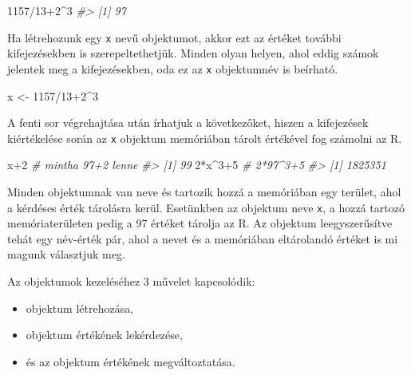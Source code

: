 \documentclass[
]{book}
\newenvironment{Shaded}{\begin{snugshade}}{\end{snugshade}}
\newcommand{\CommentTok}[1]{\textcolor[rgb]{0.56,0.35,0.01}{\textit{#1}}}
\newcommand{\DecValTok}[1]{\textcolor[rgb]{0.00,0.00,0.81}{#1}}
\newcommand{\NormalTok}[1]{#1}
\newcommand{\OtherTok}[1]{\textcolor[rgb]{0.56,0.35,0.01}{#1}}
\newcommand{\SpecialCharTok}[1]{\textcolor[rgb]{0.00,0.00,0.00}{#1}}
\providecommand{\tightlist}{%
  \setlength{\itemsep}{0pt}\setlength{\parskip}{0pt}}
\begin{document}
\begin{Shaded}
\begin{Highlighting}[]
\DecValTok{1157}\SpecialCharTok{/}\DecValTok{13}\SpecialCharTok{+}\DecValTok{2}\SpecialCharTok{\^{}}\DecValTok{3} 
\CommentTok{\#\textgreater{} [1] 97}
\end{Highlighting}
\end{Shaded}

Ha létrehozunk egy \texttt{x} nevű objektumot, akkor ezt az értéket további kifejezésekben is szerepeltethetjük. Minden olyan helyen, ahol eddig számok jelentek meg a kifejezésekben, oda ez az \texttt{x} objektumnév is beírható.

\begin{Shaded}
\begin{Highlighting}[]
\NormalTok{x }\OtherTok{\textless{}{-}} \DecValTok{1157}\SpecialCharTok{/}\DecValTok{13}\SpecialCharTok{+}\DecValTok{2}\SpecialCharTok{\^{}}\DecValTok{3} 
\end{Highlighting}
\end{Shaded}

A fenti sor végrehajtása után írhatjuk a következőket, hiszen a kifejezések kiértékelése során az \texttt{x} objektum memóriában tárolt értékével fog számolni az R.

\begin{Shaded}
\begin{Highlighting}[]
\NormalTok{x}\SpecialCharTok{+}\DecValTok{2}       \CommentTok{\# mintha 97+2 lenne}
\CommentTok{\#\textgreater{} [1] 99}
\DecValTok{2}\SpecialCharTok{*}\NormalTok{x}\SpecialCharTok{\^{}}\DecValTok{3}\SpecialCharTok{+}\DecValTok{5}   \CommentTok{\# 2*97\^{}3+5}
\CommentTok{\#\textgreater{} [1] 1825351}
\end{Highlighting}
\end{Shaded}

Minden objektumnak van neve és tartozik hozzá a memóriában egy terület, ahol a kérdéses érték tárolásra kerül. Esetünkben az objektum neve \texttt{x}, a hozzá tartozó memóriaterületen pedig a 97 értéket tárolja az R. Az objektum leegyszerűsítve tehát egy név-érték pár, ahol a nevet és a memóriában eltárolandó értéket is mi magunk választjuk meg.

Az objektumok kezeléséhez 3 művelet kapcsolódik:

\begin{itemize}
\tightlist
\item
  objektum létrehozása,
\item
  objektum értékének lekérdezése,
\item
  és az objektum értékének megváltoztatása.
\end{itemize}
\end{document}
